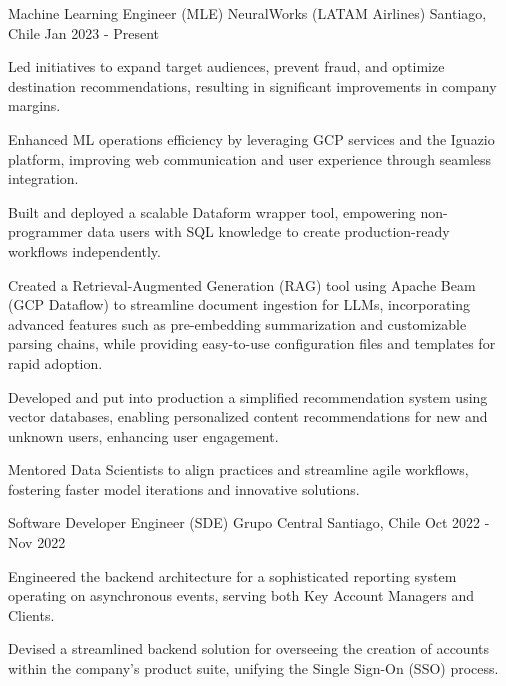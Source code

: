   \cventry
  {Machine Learning Engineer (MLE)}
  {NeuralWorks (LATAM Airlines)}
  {Santiago, Chile}
  {Jan 2023 - Present}
  {
  \begin{cvitems} %
    \item Led initiatives to expand target audiences, prevent fraud, and optimize destination recommendations, resulting in significant improvements in company margins.
    \item Enhanced ML operations efficiency by leveraging GCP services and the Iguazio platform, improving web communication and user experience through seamless integration.
    \item Built and deployed a scalable Dataform wrapper tool, empowering non-programmer data users with SQL knowledge to create production-ready workflows independently.
    \item Created a Retrieval-Augmented Generation (RAG) tool using Apache Beam (GCP Dataflow) to streamline document ingestion for LLMs, incorporating advanced features such as pre-embedding summarization and customizable parsing chains, while providing easy-to-use configuration files and templates for rapid adoption.
    \item Developed and put into production a simplified recommendation system using vector databases, enabling personalized content recommendations for new and unknown users, enhancing user engagement.
    \item Mentored Data Scientists to align practices and streamline agile workflows, fostering faster model iterations and innovative solutions.
  \end{cvitems}
  }

  \cventry
  {Software Developer Engineer (SDE)}
  {Grupo Central}
  {Santiago, Chile}
  {Oct 2022 - Nov 2022}
  {
  \begin{cvitems}
    \item Engineered the backend architecture for a sophisticated reporting system operating on asynchronous events, serving both Key Account Managers and Clients.
    \item Devised a streamlined backend solution for overseeing the creation of accounts within the company's product suite, unifying the Single Sign-On (SSO) process.
  \end{cvitems}
  }

